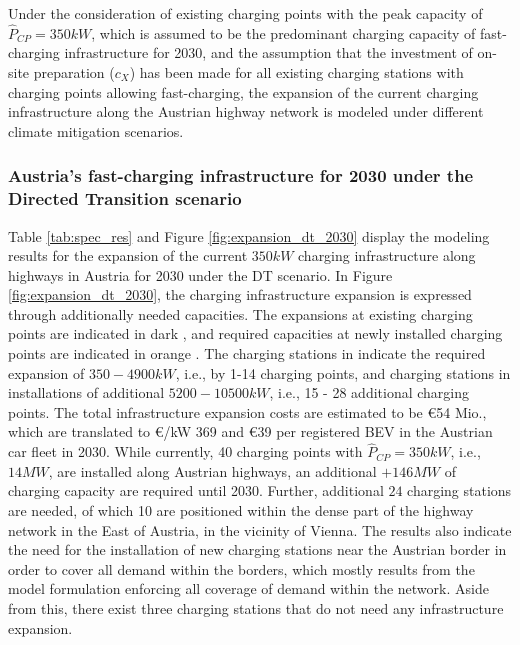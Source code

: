 Under the consideration of existing charging points with the peak capacity of $\hat{P}_{CP} = 350kW$, which is assumed to be the predominant charging capacity of fast-charging infrastructure for 2030, and the assumption that the investment of on-site preparation ($c_X$) has been made for all existing charging stations with charging points allowing fast-charging, the expansion of the current charging infrastructure along the Austrian highway network is modeled under different climate mitigation scenarios. 

\subsubsection{Austria's fast-charging infrastructure for 2030 under the Directed Transition scenario}


Table \ref{tab:spec_res} and Figure \ref{fig:expansion_dt_2030} display the modeling results for the expansion of the current $350kW$ charging infrastructure along highways in Austria for 2030 under the DT scenario. In Figure \ref{fig:expansion_dt_2030}, the charging infrastructure expansion is expressed through additionally needed capacities. The expansions at existing charging points are indicated in dark , and required capacities at newly installed charging points are indicated in orange . The charging stations in  indicate the required expansion of $350 - 4900 kW$, i.e., by 1-14 charging points, and charging stations in  installations of additional $5200 - 10500 kW$, i.e., 15 - 28 additional charging points. The total infrastructure expansion costs are estimated to be \euro54 Mio., which are translated to \euro/kW 369 and \euro39 per registered \ac{BEV} in the Austrian car fleet in 2030. While currently, 40 charging points with $\hat{P}_{CP}=350 kW$, i.e., $14 MW$, are  installed along Austrian highways, an additional $+146 MW$ of charging capacity are required until 2030. Further, additional $24$ charging stations are needed, of which 10 are positioned within the dense part of the highway network in the East of Austria, in the vicinity of Vienna. The results also indicate the need for the installation of new charging stations near the Austrian border in order to cover all demand within the borders, which mostly results from the model formulation enforcing all coverage of demand within the network. Aside from this, there exist three charging stations that do not need any infrastructure expansion.

